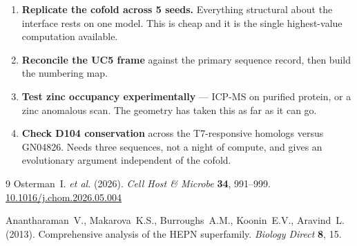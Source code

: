 \documentclass[11pt,a4paper]{article}
\begin{document}
\begin{enumerate}\itemsep2pt
\item \textbf{Replicate the cofold across 5 seeds.} Everything structural about
      the interface rests on one model. This is cheap and it is the single
      highest-value computation available.
\item \textbf{Reconcile the UC5 frame} against the primary sequence record, then
      build the numbering map.
\item \textbf{Test zinc occupancy experimentally} --- ICP-MS on purified protein,
      or a zinc anomalous scan. The geometry has taken this as far as it can go.
\item \textbf{Check D104 conservation} across the T7-responsive homologs versus
      GN04826. Needs three sequences, not a night of compute, and gives an
      evolutionary argument independent of the cofold.
\end{enumerate}

\begin{thebibliography}{9}
Osterman~I. \emph{et al.} (2026).
\newblock \emph{Cell Host \& Microbe} \textbf{34}, 991--999.
\newblock \href{https://doi.org/10.1016/j.chom.2026.05.004}{10.1016/j.chom.2026.05.004}

Anantharaman~V., Makarova~K.S., Burroughs~A.M., Koonin~E.V., Aravind~L. (2013).
\newblock Comprehensive analysis of the HEPN superfamily.
\newblock \emph{Biology Direct} \textbf{8}, 15.
\end{thebibliography}
\end{document}
